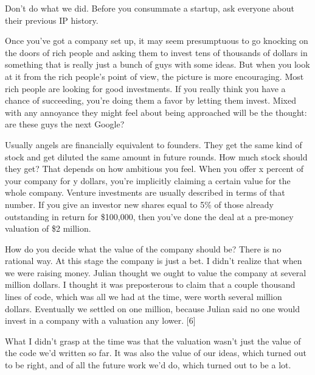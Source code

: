 Don't do what we did.
                    Before you consummate a startup, ask everyone about their
                    previous IP history.

Once you've got a company
                    set up, it may seem presumptuous to go knocking on the doors
                    of rich people and asking them to invest tens of thousands
                    of dollars in something that is really just a bunch of guys
                    with some ideas. But when you look at it from the rich
                    people's point of view, the picture is more encouraging.
                    Most rich people are looking for good investments. If you
                    really think you have a chance of succeeding, you're doing
                    them a favor by letting them invest. Mixed with any
                    annoyance they might feel about being approached will be the
                    thought: are these guys the next Google?

Usually
                    angels are financially equivalent to founders. They get the
                    same kind of stock and get diluted the same amount in future
                    rounds. How much stock should they get? That depends on how
                    ambitious you feel. When you offer x percent of your company
                    for y dollars, you're implicitly claiming a certain value
                    for the whole company. Venture investments are usually
                    described in terms of that number. If you give an investor
                    new shares equal to 5\% of those already outstanding in
                    return for \$100,000, then you've done the deal at a
                    pre-money valuation of \$2 million.

How do you
                    decide what the value of the company should be? There is no
                    rational way. At this stage the company is just a bet. I
                    didn't realize that when we were raising money. Julian
                    thought we ought to value the company at several million
                    dollars. I thought it was preposterous to claim that a
                    couple thousand lines of code, which was all we had at the
                    time, were worth several million dollars. Eventually we
                    settled on one million, because Julian said no one would
                    invest in a company with a valuation any lower. [6]

What
                    I didn't grasp at the time was that the valuation wasn't
                    just the value of the code we'd written so far. It was also
                    the value of our ideas, which turned out to be right, and of
                    all the future work we'd do, which turned out to be a
                    lot.

